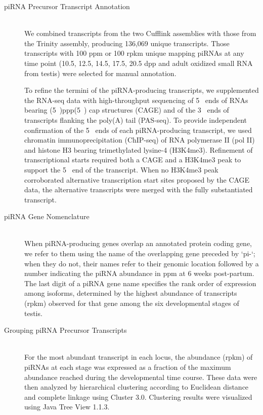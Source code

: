\begin{description}
    \item[piRNA Precursor Transcript Annotation] \hfill \\
    We combined transcripts from the two Cufflink assemblies with those from the Trinity assembly, producing 136,069 unique transcripts. Those transcripts with 100 ppm or 100 rpkm unique mapping piRNAs at any time point (10.5, 12.5, 14.5, 17.5, 20.5 dpp and adult oxidized small RNA from testis) were selected for manual annotation.

    To refine the termini of the piRNA-producing transcripts, we supplemented the RNA-seq data with high-throughput sequencing of 5\textprime~ ends of RNAs bearing (5\textprime~)ppp(5\textprime~) cap structures (CAGE) and of the 3\textprime~ ends of transcripts flanking the poly(A) tail (PAS-seq). To provide independent confirmation of the 5\textprime~ ends of each piRNA-producing transcript, we used chromatin immunoprecipitation (ChIP-seq) of RNA polymerase II (pol II) and histone H3 bearing trimethylated lysine-4 (H3K4me3). Refinement of transcriptional starts required both a CAGE and a H3K4me3 peak to support the 5\textprime~ end of the transcript. When no H3K4me3 peak corroborated alternative transcription start sites proposed by the CAGE data, the alternative transcripts were merged with the fully substantiated transcript.

    \item[piRNA Gene Nomenclature] \hfill \\
    When piRNA-producing genes overlap an annotated protein coding gene, we refer to them using the name of the overlapping gene preceded by ‘pi-‘; when they do not, their names refer to their genomic location followed by a number indicating the piRNA abundance in ppm at 6 weeks post-partum. The last digit of a piRNA gene name specifies the rank order of expression among isoforms, determined by the highest abundance of transcripts (rpkm) observed for that gene among the six developmental stages of testis.

    \item[Grouping piRNA Precursor Transcripts] \hfill \\
    For the most abundant transcript in each locus, the abundance (rpkm) of piRNAs at each stage was expressed as a fraction of the maximum abundance reached during the developmental time course. These data were then analyzed by hierarchical clustering according to Euclidean distance and complete linkage using Cluster 3.0. Clustering results were visualized using Java Tree View 1.1.3.


\end{description}
